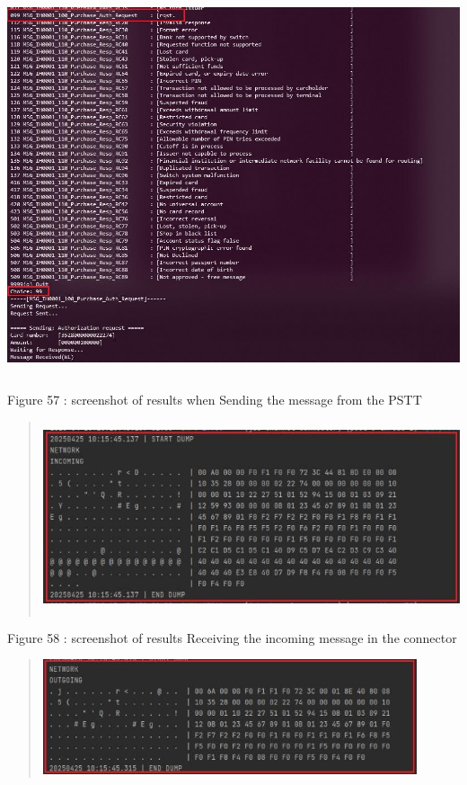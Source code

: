 \documentclass[12pt,a4paper]{report}
\begin{document}
\includegraphics[width=5.60116in,height=4.38946in]{vertopal_d1b0b2209edd4c6aa8254f57daa0953b/media/image76.jpeg}

\protect\hypertarget{_Toc201954533}{}{}Figure 57 : screenshot of results
when Sending the message from the PSTT

\begin{quote}
\includegraphics[width=5.33049in,height=2.21511in]{vertopal_d1b0b2209edd4c6aa8254f57daa0953b/media/image77.jpeg}
\end{quote}

\protect\hypertarget{_Toc201954534}{}{}Figure 58 : screenshot of results
Receiving the incoming message in the connector

\begin{quote}
\includegraphics[width=4.3366in,height=1.32487in]{vertopal_d1b0b2209edd4c6aa8254f57daa0953b/media/image78.jpeg}
\end{quote}
\end{document}
